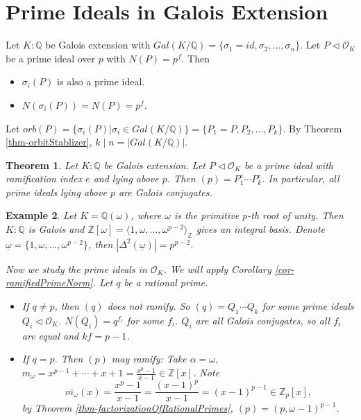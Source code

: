 \documentclass[11pt]{book}
\newtheorem{theorem}{Theorem}[section]
\newtheorem{example}[theorem]{Example}
\begin{document}
\section{Prime Ideals in Galois Extension}
Let $K:\mathbb{Q}$ be Galois extension with $Gal(K /\mathbb{Q})=\{\sigma_{1}=id,\sigma_{2},\dots, \sigma_{n}\}$. Let $P\lhd \mathcal{O}_{K}$ be a prime ideal over $p$ with $N(P)=p^{f}$. Then 
\begin{itemize}
    \item $\sigma_{i}(P)$ is also a prime ideal. 
    \item $N(\sigma_{i}(P))=N(P)=p^{f}$. 
\end{itemize}
Let $orb(P)=\{\sigma_{i}(P)|\sigma_{i}\in Gal(K /\mathbb{Q})\}=\{P_{1}=P,P_{2},\dots, P_{k}\}$. By Theorem \ref{thm-orbitStablizer}, $k\mid n=\left| Gal(K /\mathbb{Q}) \right| $. 

\begin{theorem}
    Let $K :\mathbb{Q}$ be Galois extension. Let $P\lhd \mathcal{O}_{K}$ be a prime ideal with ramification index $e$ and lying above $p$. Then $(p)=P_{1}^{e}\cdots P_{k}^{e}$. In particular, all prime ideals lying above $p$ are Galois conjugates. 
\end{theorem}

\begin{example}
    Let $K=\mathbb{Q}(\omega)$, where $\omega$ is the primitive $p$-th root of unity. Then $K:\mathbb{Q}$ is Galois and $\mathbb{Z}[\omega]=\langle 1,\omega,\dots, \omega^{p-2}\rangle_{\mathbb{Z}}$ gives an integral basis. Denote $\underline{\omega}=\{1,\omega,\dots, \omega^{p-2}\}$, then $\left| \Delta^{2}(\underline{\omega}) \right|=p^{p-2}$. 

    Now we study the prime ideals in $\mathcal{O}_{K}$. We will apply Corollary \ref{cor-ramifiedPrimeNorm}. Let $q$ be a rational prime. 
    \begin{itemize}
        \item If $q\neq p$, then $(q)$ does not ramify. So $(q)=Q_{1}\cdots Q_{k}$ for some prime ideals $Q_{i}\lhd \mathcal{O}_{K}$. $N(Q_{i})=q^{f_{i}}$ for some $f_{i}$. $Q_{i}$ are all Galois conjugates, so all $f_{i}$ are equal and $kf=p-1$. 
        \item If $q=p$. Then $(p)$ may ramify: Take $\alpha=\omega$, $m_{\omega}=x^{p-1}+\cdots+ x+1=\frac{x^{p}-1}{x-1}\in \mathbb{Z}[x]$. Note 
        \[
        \overline{m_{\omega}}(x)=\frac{x^{p}-1}{x-1}=\frac{(x-1)^{p}}{x-1}=(x-1)^{p-1}\in \mathbb{Z}_{p}[x],
        \]
        by Theorem \ref{thm-factorizationOfRationalPrimes}, $(p)=(p,\omega-1)^{p-1}$. 
    \end{itemize}
\end{example}
\end{document}
